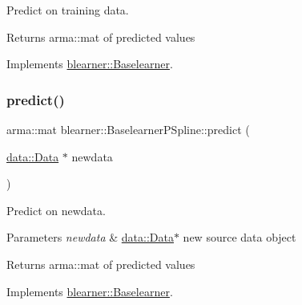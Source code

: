 Predict on training data. 

\begin{DoxyReturn}{Returns}
{\ttfamily arma\+::mat} of predicted values 
\end{DoxyReturn}


Implements \mbox{\hyperlink{classblearner_1_1_baselearner_ab37986047db43c84420fef2cef7fc20d}{blearner\+::\+Baselearner}}.

\mbox{\label{classblearner_1_1_baselearner_p_spline_a241485cc3e932c45564370a0881e3772}} 
\subsubsection{\texorpdfstring{predict()}{predict()}\hspace{0.1cm}{\footnotesize\ttfamily [2/2]}}
{\footnotesize\ttfamily arma\+::mat blearner\+::\+Baselearner\+P\+Spline\+::predict (\begin{DoxyParamCaption}\item[{\mbox{\hyperlink{classdata_1_1_data}{data\+::\+Data}} $\ast$}]{newdata }\end{DoxyParamCaption})\hspace{0.3cm}{\ttfamily [virtual]}}



Predict on newdata. 


\begin{DoxyParams}{Parameters}
{\em newdata} & {\ttfamily \mbox{\hyperlink{classdata_1_1_data}{data\+::\+Data}}$\ast$} new source data object\\
\hline
\end{DoxyParams}
\begin{DoxyReturn}{Returns}
{\ttfamily arma\+::mat} of predicted values 
\end{DoxyReturn}


Implements \mbox{\hyperlink{classblearner_1_1_baselearner_ae2ef5e018783578e02b3b5a33fa94eae}{blearner\+::\+Baselearner}}.


